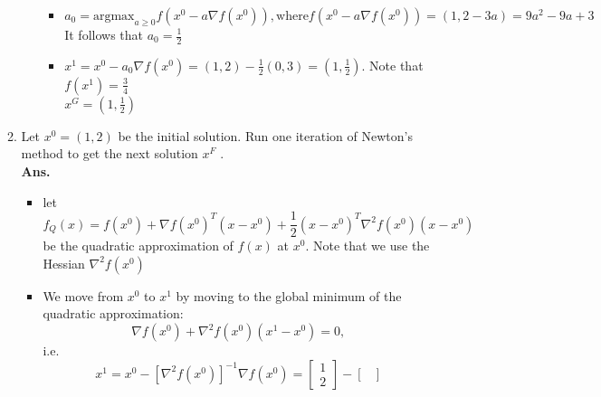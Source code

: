 \documentclass[12pt]{article}
\begin{document}
\begin{enumerate}
\begin{enumerate}
\begin{itemize}
\begin{itemize}
                                          \item $a_0 = \text{argmax}_{a\ge 0}f(x^0-a\nabla f(x^0)), \text{where} f(x^0-a\nabla f(x^0)) = (1,2-3a)=9a^2-9a+3$
                                                It follows that $a_0 = \frac{1}{2}$
                                          \item $x^1 = x^0 - a_0\nabla f(x^0) = (1,2) - \frac{1}{2}(0,3) = (1, \frac{1}{2})$. Note that $f(x^1) = \frac{3}{4}$\\
                                                $x^G = (1, \frac{1}{2})$
                                    \end{itemize}
                        \end{itemize}
                  \item Let $x^0 = (1, 2)$ be the initial solution. Run one iteration of Newton’s method to get the next solution $x^F$ .\\
                        \textbf{Ans.}
                        \begin{itemize}
                              \item let
                                    \begin{equation*}
                                          f_Q(x) = f(x^0) + \nabla f(x^0)^T(x-x^0) + \frac{1}{2}(x-x^0)^T\nabla^2f(x^0)(x-x^0)
                                    \end{equation*}
                                    be the quadratic approximation of $f(x)$ at $x^0$.
                                    Note that we use the Hessian $\nabla^2f(x^0)$
                              \item We move from $x^0$ to $x^{1}$ by moving to the global minimum of the quadratic approximation:
                                    \begin{equation*}
                                          \nabla f(x^0) + \nabla^2f(x^0)(x^{1}-x^0) = 0,
                                    \end{equation*}
                                    i.e.
                                    \begin{equation*}
                                          x^{1} = x^0 - [\nabla^2f(x^0)]^{-1}\nabla f(x^0)=\begin{bmatrix}
                                                1 \\
                                                2
                                          \end{bmatrix} - \begin{bmatrix}

\end{bmatrix}
\end{equation*}
\end{itemize}
\end{enumerate}
\end{enumerate}
\end{document}
